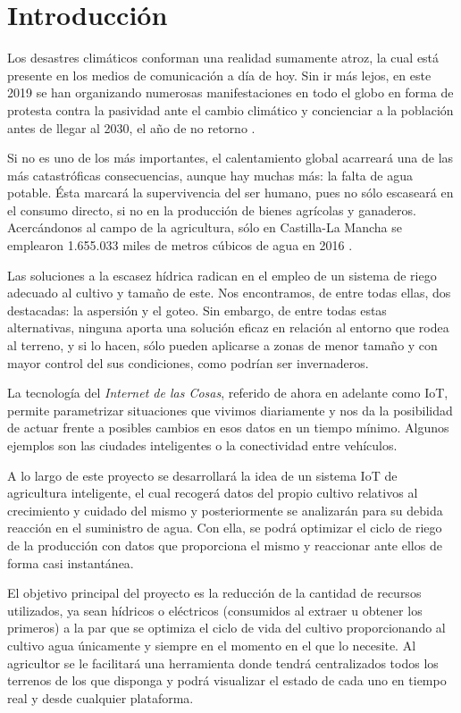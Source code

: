 \chapter{Introducción}
\label{cap:Introduccion}

Los desastres climáticos conforman una realidad sumamente atroz, la cual está presente en los medios de comunicación a día de hoy. Sin ir más lejos, en este 2019 se han organizando numerosas manifestaciones en todo el globo en forma de protesta contra la pasividad ante el cambio climático y concienciar a la población antes de llegar al 2030, el año de no retorno \cite{elpais01}.

Si no es uno de los más importantes, el calentamiento global acarreará una de las más catastróficas consecuencias, aunque hay muchas más: la falta de agua potable. Ésta marcará la supervivencia del ser humano, pues no sólo escaseará en el consumo directo, si no en la producción de bienes agrícolas y ganaderos. Acercándonos al campo de la agricultura, sólo en Castilla-La Mancha se emplearon 1.655.033 miles de metros cúbicos de agua en 2016 \cite{ine01}.

Las soluciones a la escasez hídrica radican en el empleo de un sistema de riego adecuado al cultivo y tamaño de este. Nos encontramos, de entre todas ellas, dos destacadas: la aspersión y el goteo. Sin embargo, de entre todas estas alternativas, ninguna aporta una solución eficaz en relación al entorno que rodea al terreno, y si lo hacen, sólo pueden aplicarse a zonas de menor tamaño y con mayor control del sus condiciones, como podrían ser invernaderos.

La tecnología del \emph{Internet de las Cosas}, referido de ahora en adelante como IoT, permite parametrizar situaciones que vivimos diariamente y nos da la posibilidad de actuar frente a posibles cambios en esos datos en un tiempo mínimo. Algunos ejemplos son las ciudades inteligentes o la conectividad entre vehículos.

A lo largo de este proyecto se desarrollará la idea de un sistema IoT de agricultura inteligente, el cual recogerá datos del propio cultivo relativos al crecimiento y cuidado del mismo y posteriormente se analizarán para su debida reacción en el suministro de agua. Con ella, se podrá optimizar el ciclo de riego de la producción con datos que proporciona el mismo y reaccionar ante ellos de forma casi instantánea.

El objetivo principal del proyecto es la reducción de la cantidad de recursos utilizados, ya sean hídricos o eléctricos (consumidos al extraer u obtener los primeros) a la par que se optimiza el ciclo de vida del cultivo proporcionando al cultivo agua únicamente y siempre en el momento en el que lo necesite. Al agricultor se le facilitará una herramienta donde tendrá centralizados todos los terrenos de los que disponga y podrá visualizar el estado de cada uno en tiempo real y desde cualquier plataforma. 